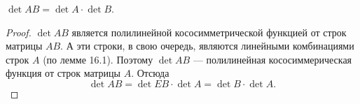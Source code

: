 \begin{theorem}
    $\det AB = \det A \cdot \det B$.
\end{theorem}

\begin{proof}
    $\det AB$ является полилинейной кососимметрической функцией от строк матрицы $AB$. А эти строки, в свою очередь, являются линейными комбинациями строк $A$ (по лемме 16.1). Поэтому $\det AB$ --- полилинейная кососиммерическая функция от строк матрицы $A$. Отсюда
    $$
    \det AB = \det EB \cdot \det A = \det B \cdot \det A.
    $$
\end{proof}


